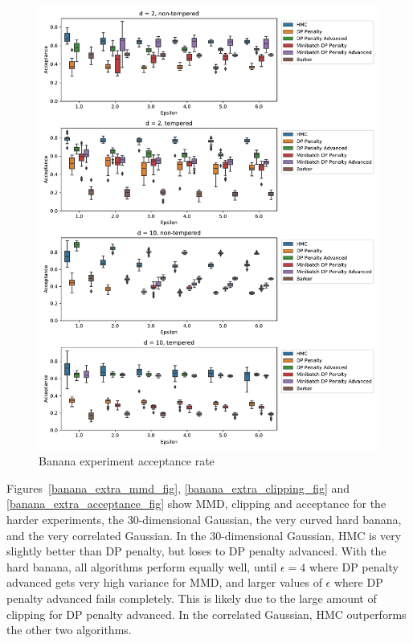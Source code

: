 ﻿\documentclass[a4paper]{article}
\begin{document}
\begin{figure}[h]
  \centering
  \includegraphics[width=\textwidth]{figures/banana_acceptance}
  \caption{Banana experiment acceptance rate}
  \label{banana_acceptance_fig}
\end{figure}

Figures~\ref{banana_extra_mmd_fig}, \ref{banana_extra_clipping_fig} and
\ref{banana_extra_acceptance_fig} show MMD, clipping and acceptance for
the harder experiments, the 30-dimensional Gaussian, the very curved
hard banana, and the very correlated Gaussian. In the 30-dimensional
Gaussian, HMC is very slightly better than DP penalty, but loses to
DP penalty advanced. With the hard banana, all algorithms perform equally well,
until \(\epsilon = 4\) where DP penalty advanced gets very high variance
for MMD, and larger values of \(\epsilon\) where DP penalty advanced fails
completely. This is likely due to the large amount of clipping for DP penalty
advanced. In the correlated Gaussian, HMC outperforms the other two
algorithms.
\end{document}

